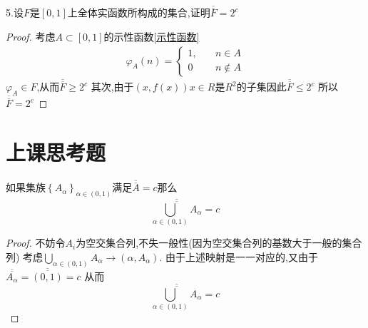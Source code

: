 5.设\(F\)是\([0,1]\)上全体实函数所构成的集合,证明\(\overline{\overline{F}}= 2^c\)
\begin{proof}
    考虑\(A \subset [0,1]\)的示性函数\ref{示性函数}\begin{align*}
        \varphi_A(n)=\begin{cases}
            1,\quad &n\in A \\ 
            0 \quad & n \notin A 
        \end{cases}
    \end{align*}
    \(\varphi_A \in F\),从而\(\overline{\overline{F}} \geq 2^c\)
    其次,由于\((x,f(x)) x \in R\)是\(R^2\)的子集因此\(\overline{\overline{F}} \leq 2^c\)
    所以\(\overline{\overline{F}} = 2^c\)
\end{proof}
\section{上课思考题}
如果集族\(\left\{A_{\alpha}\right\}_{\alpha \in (0,1)}\)满足\(\overline{\overline{A}}=c\)那么\[\overline{\overline{\bigcup\limits_{\alpha\in (0,1)}A_{\alpha}}}=c\]
\begin{proof}
    不妨令\(A_i\)为空交集合列,不失一般性(因为空交集合列的基数大于一般的集合列)
    考虑\(\bigcup\limits_{\alpha \in (0,1)}A_{\alpha} \rightarrow (\alpha , A_{\alpha})\).
    由于上述映射是一一对应的,又由于\(\overline{\overline{A_{\alpha}}}=\overline{\overline{(0,1)}} = c\)
    从而\[\overline{\overline{\bigcup\limits_{\alpha \in (0,1)}A_{\alpha}}} = c \]
\end{proof}
